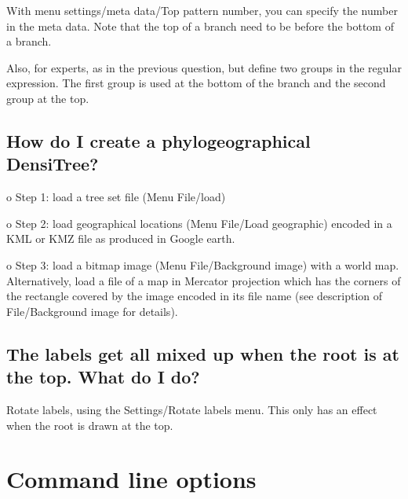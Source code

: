\documentclass{article}
\begin{document}
With menu settings/meta data/Top pattern number, you can specify the number in the meta data.
Note that the top of a branch need to be before the bottom of a branch.

Also, for experts, as in the previous question, but define two groups in the regular expression.
The first group is used at the bottom of the branch and the second group at the top.

\subsection{How do I create a phylogeographical DensiTree?}
o Step 1: load a tree set file (Menu File/load)

\noindent o Step 2: load geographical locations (Menu File/Load geographic) encoded in a KML or KMZ file as
produced in Google earth.

\noindent o Step 3: load a bitmap image (Menu File/Background image) with a world map.
Alternatively, load a file of a map in Mercator projection which has the 
corners of the rectangle covered by the image encoded in its file name (see 
description of File/Background image for details).

\subsection{The labels get all mixed up when the root is at the top. What do I do?}
Rotate labels, using the Settings/Rotate labels menu. This only has an effect when the root
is drawn at the top.


%


\newpage
\section{Command line options\label{sec.cmd}}
\end{document}
